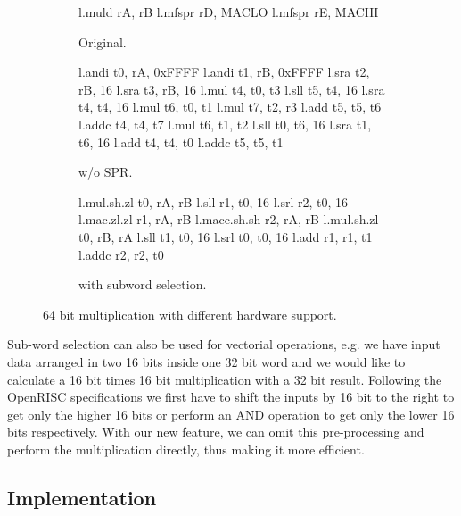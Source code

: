 
\begin{figure}[H]
 \begin{subfigure}[b]{0.30\linewidth}
   \footnotesize
   \begin{instrenv}
l.muld  rA, rB
l.mfspr rD, MACLO
l.mfspr rE, MACHI
   \end{instrenv}
  \caption{Original.}
  \label{fig:mul64_original}
 \end{subfigure}\hfill
 \begin{subfigure}[b]{0.30\linewidth}
   \footnotesize
   \begin{instrenv}
l.andi t0, rA, 0xFFFF
l.andi t1, rB, 0xFFFF
l.sra  t2, rB, 16
l.sra  t3, rB, 16
l.mul  t4, t0, t3
l.sll  t5, t4, 16
l.sra  t4, t4, 16
l.mul  t6, t0, t1
l.mul  t7, t2, r3
l.add  t5, t5, t6
l.addc t4, t4, t7
l.mul  t6, t1, t2
l.sll  t0, t6, 16
l.sra  t1, t6, 16
l.add  t4, t4, t0
l.addc t5, t5, t1
   \end{instrenv}
  \caption{w/o SPR.}
  \label{fig:mul64_wo_spr}
 \end{subfigure}\hfill
 \begin{subfigure}[b]{0.33\linewidth}
   \footnotesize
   \begin{instrenv}
l.mul.sh.zl  t0, rA, rB
l.sll        r1, t0, 16
l.srl        r2, t0, 16
l.mac.zl.zl  r1, rA, rB
l.macc.sh.sh r2, rA, rB
l.mul.sh.zl  t0, rB, rA
l.sll        t1, t0, 16
l.srl        t0, t0, 16
l.add        r1, r1, t1
l.addc       r2, r2, t0
   \end{instrenv}
  \caption{with subword selection.}
  \label{fig:mul64_subword}
 \end{subfigure}

 \caption{64 bit multiplication with different hardware support.}
 \label{fig:mul64_instructions}
\end{figure}

Sub-word selection can also be used for vectorial operations, e.g. we have input
data arranged in two 16 bits inside one 32 bit word and we would like to
calculate a 16 bit times 16 bit multiplication with a 32 bit result. Following
the OpenRISC specifications we first have to shift the inputs by 16 bit to the
right to get only the higher 16 bits or perform an AND operation to get only the
lower 16 bits respectively. With our new feature, we can omit this pre-processing
and perform the multiplication directly, thus making it more efficient.


\subsection{Implementation}


